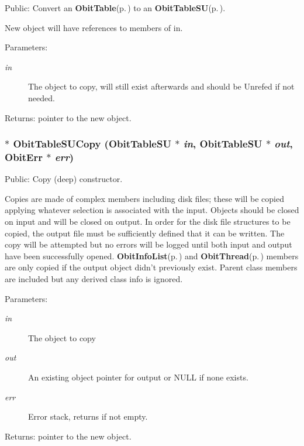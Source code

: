 Public: Convert an {\bf Obit\-Table}{\rm (p.\,\pageref{structObitTable})} to an {\bf Obit\-Table\-SU}{\rm (p.\,\pageref{structObitTableSU})}. 

New object will have references to members of in. \begin{Desc}
\item[Parameters:]
\begin{description}
\item[{\em in}]The object to copy, will still exist afterwards and should be Unrefed if not needed. \end{description}
\end{Desc}
\begin{Desc}
\item[Returns:]pointer to the new object. \end{Desc}
\subsubsection{$\ast$ Obit\-Table\-SUCopy ({\bf Obit\-Table\-SU} $\ast$ {\em in}, {\bf Obit\-Table\-SU} $\ast$ {\em out}, {\bf Obit\-Err} $\ast$ {\em err})}\label{ObitTableSU_8h_a14}


Public: Copy (deep) constructor. 

Copies are made of complex members including disk files; these will be copied applying whatever selection is associated with the input. Objects should be closed on input and will be closed on output. In order for the disk file structures to be copied, the output file must be sufficiently defined that it can be written. The copy will be attempted but no errors will be logged until both input and output have been successfully opened. {\bf Obit\-Info\-List}{\rm (p.\,\pageref{structObitInfoList})} and {\bf Obit\-Thread}{\rm (p.\,\pageref{structObitThread})} members are only copied if the output object didn't previously exist. Parent class members are included but any derived class info is ignored. \begin{Desc}
\item[Parameters:]
\begin{description}
\item[{\em in}]The object to copy \item[{\em out}]An existing object pointer for output or NULL if none exists. \item[{\em err}]Error stack, returns if not empty. \end{description}
\end{Desc}
\begin{Desc}
\item[Returns:]pointer to the new object. \end{Desc}
